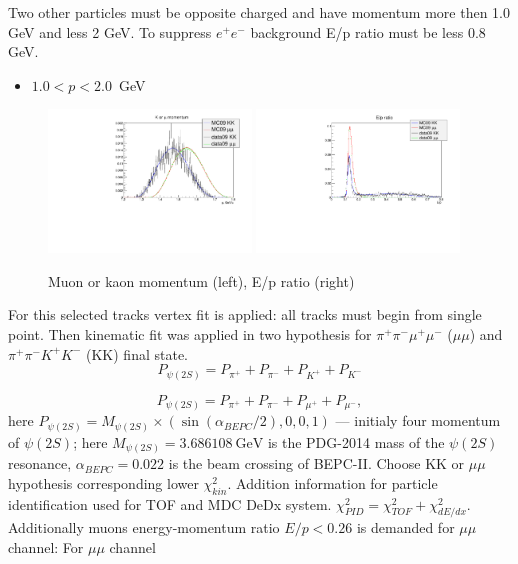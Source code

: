 \documentclass[a4paper,12pt]{article}
\newcommand{\ee}{e^{+}e^{-}}
\begin{document}
Two other particles must be opposite charged and have momentum more then 1.0
GeV and less 2 GeV. To suppress $\ee$ background E/p ratio must be less 0.8
GeV.
\begin{itemize}
	\item $1.0<p<2.0$~GeV
\end{itemize}

\begin{figure}
\begin{center}
  \includegraphics[width=0.48\textwidth]{fig/p.pdf} \hfill
  \includegraphics[width=0.48\textwidth]{fig/Ep.pdf}
  \caption{Muon or kaon momentum (left), E/p ratio (right)}
\end{center}
\end{figure}


For this selected tracks vertex fit is applied: all tracks must begin from single point.
Then kinematic fit was applied in two hypothesis for $\pi^+\pi^-\mu^+\mu^-$ ($\mu\mu$) and
$\pi^+\pi^-K^+K^-$ (KK) final state. 
\[
	P_{\psi(2S)} = P_{\pi^+} +  P_{\pi^-} + P_{K^+} +  P_{K^-}
\]

\[
	P_{\psi(2S)} = P_{\pi^+} +  P_{\pi^-} + P_{\mu^+} +  P_{\mu^-},
\]
here  $P_{\psi(2S)} = M_{\psi(2S)}\times (\sin(\alpha_{BEPC}/2),0,0, 1)$ ---
initialy four momentum of $\psi(2S)$;  here $M_{\psi(2S)} = 3.686108\
\mbox{GeV}$ is the PDG-2014 mass of the $\psi(2S)$ resonance,
$\alpha_{BEPC}=0.022$ is the beam crossing of BEPC-II. Choose KK or $\mu\mu$
hypothesis corresponding lower $\chi^2_{kin}$. Addition information for
particle identification used for TOF and MDC DeDx system.
$\chi^2_{PID} = \chi^2_{TOF} + \chi^2_{dE/dx}$. Additionally muons energy-momentum
ratio $E/p<0.26$ is demanded for $\mu\mu$ channel:
For $\mu\mu$ channel
\end{document}
